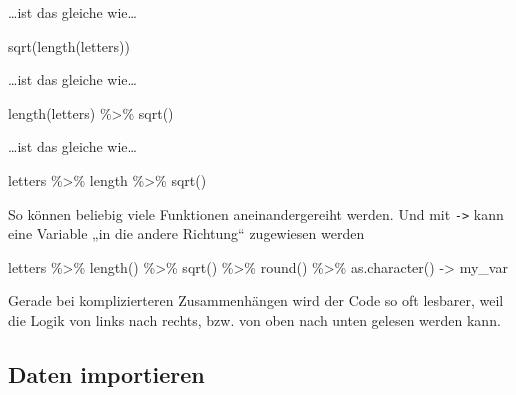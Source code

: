 \documentclass[
  ngerman,
]{article}
\newenvironment{Shaded}{\begin{snugshade}}{\end{snugshade}}
\newcommand{\FunctionTok}[1]{\textcolor[rgb]{0.00,0.00,0.00}{#1}}
\newcommand{\NormalTok}[1]{#1}
\newcommand{\OtherTok}[1]{\textcolor[rgb]{0.56,0.35,0.01}{#1}}
\newcommand{\SpecialCharTok}[1]{\textcolor[rgb]{0.00,0.00,0.00}{#1}}
\begin{document}
\ldots ist das gleiche wie\ldots{}

\begin{Shaded}
\begin{Highlighting}[]
\FunctionTok{sqrt}\NormalTok{(}\FunctionTok{length}\NormalTok{(letters))}
\end{Highlighting}
\end{Shaded}

\ldots ist das gleiche wie\ldots{}

\begin{Shaded}
\begin{Highlighting}[]
\FunctionTok{length}\NormalTok{(letters) }\SpecialCharTok{\%\textgreater{}\%}
  \FunctionTok{sqrt}\NormalTok{()}
\end{Highlighting}
\end{Shaded}

\ldots ist das gleiche wie\ldots{}

\begin{Shaded}
\begin{Highlighting}[]
\NormalTok{letters }\SpecialCharTok{\%\textgreater{}\%}
\NormalTok{  length }\SpecialCharTok{\%\textgreater{}\%}
  \FunctionTok{sqrt}\NormalTok{()}
\end{Highlighting}
\end{Shaded}

So können beliebig viele Funktionen aneinandergereiht werden. Und mit \texttt{-\textgreater{}} kann eine Variable „in die andere Richtung`` zugewiesen werden

\begin{Shaded}
\begin{Highlighting}[]
\NormalTok{letters }\SpecialCharTok{\%\textgreater{}\%}
  \FunctionTok{length}\NormalTok{() }\SpecialCharTok{\%\textgreater{}\%}
  \FunctionTok{sqrt}\NormalTok{() }\SpecialCharTok{\%\textgreater{}\%}
  \FunctionTok{round}\NormalTok{() }\SpecialCharTok{\%\textgreater{}\%}
  \FunctionTok{as.character}\NormalTok{() }\OtherTok{{-}\textgreater{}}
\NormalTok{  my\_var}
\end{Highlighting}
\end{Shaded}

Gerade bei komplizierteren Zusammenhängen wird der Code so oft lesbarer, weil die Logik von links nach rechts, bzw. von oben nach unten gelesen werden kann.

\hypertarget{daten-importieren}{%
\subsection{Daten importieren}\label{daten-importieren}}
\end{document}
